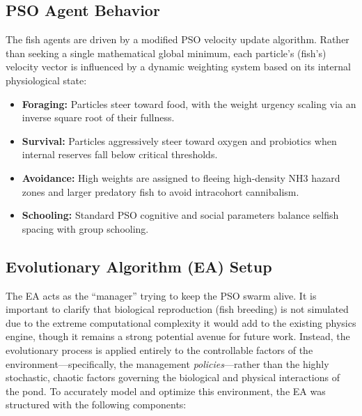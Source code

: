 \documentclass[conference]{IEEEtran}
\begin{document}
\subsection{PSO Agent Behavior}
The fish agents are driven by a modified PSO velocity update algorithm. Rather than seeking a single mathematical global minimum, each particle's (fish's) velocity vector is influenced by a dynamic weighting system based on its internal physiological state:
\begin{itemize}
    \item \textbf{Foraging:} Particles steer toward food, with the weight urgency scaling via an inverse square root of their fullness.
    \item \textbf{Survival:} Particles aggressively steer toward oxygen and probiotics when internal reserves fall below critical thresholds.
    \item \textbf{Avoidance:} High weights are assigned to fleeing high-density NH3 hazard zones and larger predatory fish to avoid intracohort cannibalism.
    \item \textbf{Schooling:} Standard PSO cognitive and social parameters balance selfish spacing with group schooling.
\end{itemize}

\subsection{Evolutionary Algorithm (EA) Setup}
The EA acts as the ``manager'' trying to keep the PSO swarm alive. It is important to clarify that biological reproduction (fish breeding) is not simulated due to the extreme computational complexity it would add to the existing physics engine, though it remains a strong potential avenue for future work. Instead, the evolutionary process is applied entirely to the controllable factors of the environment---specifically, the management \textit{policies}---rather than the highly stochastic, chaotic factors governing the biological and physical interactions of the pond. To accurately model and optimize this environment, the EA was structured with the following components:
\end{document}
